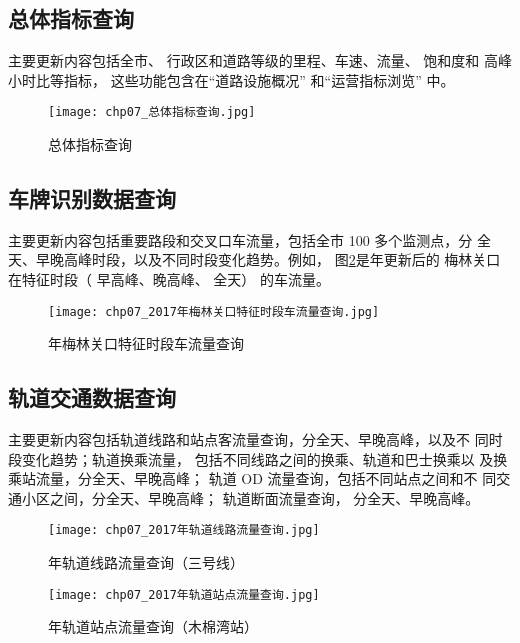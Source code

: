 \subsection{总体指标查询}
主要更新内容包括全市、 行政区和道路等级的里程、车速、流量、 饱和度和
高峰小时比等指标， 这些功能包含在“道路设施概况” 和“运营指标浏览” 中。

\begin{figure}[!ht]
  \centering
  \texttt{[image: chp07\_总体指标查询.jpg]}
  \caption{总体指标查询\label{fig:chp07_总体指标查询} }
\end{figure}

\subsection{车牌识别数据查询}
主要更新内容包括重要路段和交叉口车流量，包括全市 100 多个监测点，分
全天、早晚高峰时段，以及不同时段变化趋势。例如， 图\ref{fig:chp07_2017年梅林关口特征时段车流量查询}是\pyear 年更新后的
梅林关口在特征时段（ 早高峰、晚高峰、 全天） 的车流量。

\begin{figure}[!ht]
  \centering
  \texttt{[image: chp07\_2017年梅林关口特征时段车流量查询.jpg]}
  \caption{\pyear 年梅林关口特征时段车流量查询\label{fig:chp07_2017年梅林关口特征时段车流量查询} }
\end{figure}


\subsection{轨道交通数据查询}
主要更新内容包括轨道线路和站点客流量查询，分全天、早晚高峰，以及不
同时段变化趋势；轨道换乘流量， 包括不同线路之间的换乘、轨道和巴士换乘以
及换乘站流量，分全天、早晚高峰； 轨道 OD 流量查询，包括不同站点之间和不
同交通小区之间，分全天、早晚高峰； 轨道断面流量查询， 分全天、早晚高峰。

\begin{figure}[!ht]
  \centering
  \texttt{[image: chp07\_2017年轨道线路流量查询.jpg]}
  \caption{\pyear 年轨道线路流量查询（三号线）\label{fig:chp07_2017年轨道线路流量查询} }
\end{figure}

\begin{figure}[!ht]
  \centering
  \texttt{[image: chp07\_2017年轨道站点流量查询.jpg]}
  \caption{\pyear 年轨道站点流量查询（木棉湾站）\label{fig:chp07_2017年轨道站点流量查询} }
\end{figure}

